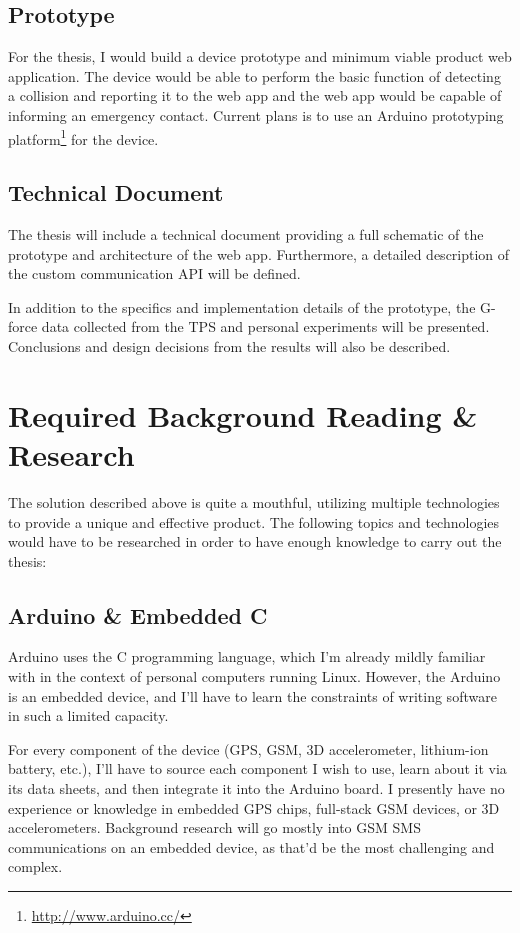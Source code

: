 \documentclass[titlepage]{article}
\begin{document}
{\subsection{Prototype}
For the thesis, I would build a device prototype and minimum viable product web application. The device would be able to perform the basic function of detecting a collision and reporting it to the web app and the web app would be capable of informing an emergency contact. Current plans is to use an Arduino prototyping platform\footnote{\url{http://www.arduino.cc/}} for the device.

\subsection{Technical Document}
The thesis will include a technical document providing a full schematic of the prototype and architecture of the web app. Furthermore, a detailed description of the custom communication API will be defined.

In addition to the specifics and implementation details of the prototype, the G-force data collected from the TPS and personal experiments will be presented. Conclusions and design decisions from the results will also be described.

\section{Required Background Reading \& Research}
The solution described above is quite a mouthful, utilizing multiple technologies to provide a unique and effective product. The following topics and technologies would have to be researched in order to have enough knowledge to carry out the thesis:

\subsection{Arduino \& Embedded C}
Arduino uses the C programming language, which I'm already mildly familiar with in the context of personal computers running Linux. However, the Arduino is an embedded device, and I'll have to learn the constraints of writing software in such a limited capacity.

For every component of the device (GPS, GSM, 3D accelerometer, lithium-ion battery, etc.), I'll have to source each component I wish to use, learn about it via its data sheets, and then integrate it into the Arduino board. I presently have no experience or knowledge in embedded GPS chips, full-stack GSM devices, or 3D accelerometers. Background research will go mostly into GSM SMS communications on an embedded device, as that'd be the most challenging and complex.

}
\end{document}
